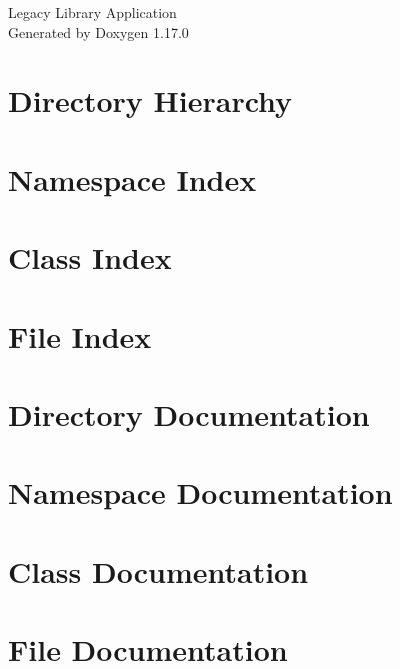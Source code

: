 \documentclass[twoside]{book}
\newcommand{\+}{\discretionary{\mbox{\scriptsize$\hookleftarrow$}}{}{}}
\newcommand{\clearemptydoublepage}{%
    \newpage{\pagestyle{empty}\cleardoublepage}%
  }
\begin{document}
  \raggedbottom
    \hypersetup{pageanchor=false,
                bookmarksnumbered=true,
                pdfencoding=unicode
               }
  \begin{titlepage}
  \vspace*{7cm}
  \begin{center}%
  {\Large Legacy Library Application}\\
  \vspace*{1cm}
  {\large Generated by Doxygen 1.17.0}\\
  \end{center}
  \end{titlepage}
  \clearemptydoublepage
  \tableofcontents
  \clearemptydoublepage
  \hypersetup{pageanchor=true}
\chapter{Directory Hierarchy}

\chapter{Namespace Index}

\chapter{Class Index}

\chapter{File Index}

\chapter{Directory Documentation}


\chapter{Namespace Documentation}

\chapter{Class Documentation}

\chapter{File Documentation}


  \backmatter
  \newpage
  \clearemptydoublepage
  \printindex
\end{document}
